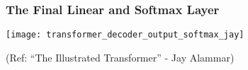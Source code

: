 \begin{frame}[fragile]\frametitle{The Final Linear and Softmax Layer}


\begin{center}
\texttt{[image: transformer\_decoder\_output\_softmax\_jay]}


{\tiny (Ref: ``The Illustrated Transformer'' - Jay Alammar)}
\end{center}	

\end{frame}




			
			
		



			
			
		




			
